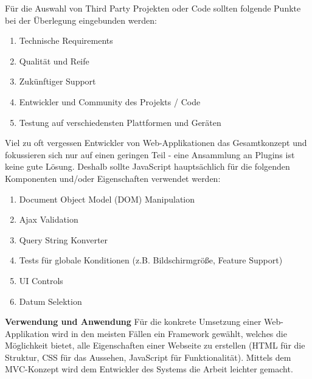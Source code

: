 \begin{description}
Für die Auswahl von Third Party Projekten oder Code sollten folgende Punkte bei der Überlegung eingebunden werden:
\begin{enumerate}
\item Technische Requirements 
\item Qualität und Reife
\item Zukünftiger Support
\item Entwickler und Community des Projekts / Code
\item Testung auf verschiedensten Plattformen und Geräten
\end{enumerate}

Viel zu oft vergessen Entwickler von Web-Applikationen das Gesamtkonzept und fokussieren sich nur auf einen geringen Teil - eine Ansammlung an Plugins ist keine gute Lösung. Deshalb sollte JavaScript hauptsächlich für die folgenden Komponenten und/oder Eigenschaften verwendet werden:
\begin{enumerate}
\item Document Object Model (DOM) Manipulation
\item Ajax Validation
\item Query String Konverter
\item Tests für globale Konditionen (z.B. Bildschirmgröße, Feature Support)
\item UI Controls
\item Datum Selektion
\end{enumerate}
\end{description}

\textbf{Verwendung und Anwendung\newline}
\label{subsec:jsframeworks}
Für die konkrete Umsetzung einer Web-Applikation wird in den meisten Fällen ein Framework gewählt, welches die Möglichkeit bietet, alle Eigenschaften einer Webseite zu erstellen (HTML für die Struktur, CSS für das Aussehen, JavaScript für Funktionalität). Mittels dem MVC-Konzept \cite{MELD.CH3-web-app.js4} wird dem Entwickler des Systems die Arbeit leichter gemacht.

